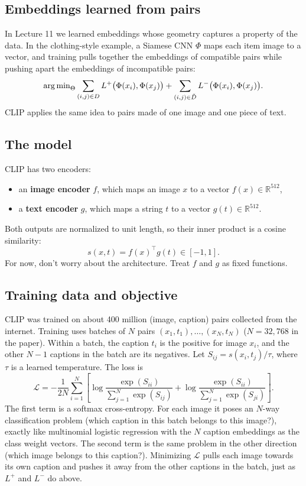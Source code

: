 \subsection{Embeddings learned from pairs}

In Lecture 11 we learned embeddings whose geometry captures a property of the
data. In the clothing-style example, a Siamese CNN $\Phi$ maps each item image to a
vector, and training pulls together the embeddings of compatible pairs while pushing
apart the embeddings of incompatible pairs:
\[
  \operatorname{arg\,min}_\Theta \sum_{(i,j) \in D} L^+\big(\Phi(x_i), \Phi(x_j)\big)
  + \sum_{(i,j) \in \tilde D} L^-\big(\Phi(x_i), \Phi(x_j)\big).
\]
CLIP applies the same idea to pairs made of one image and one piece of text.

\subsection{The model}

CLIP has two encoders:
\begin{itemize}
\item an \textbf{image encoder} $f$, which maps an image $x$ to a vector $f(x) \in \mathbb{R}^{512}$,
\item a \textbf{text encoder} $g$, which maps a string $t$ to a vector $g(t) \in \mathbb{R}^{512}$.
\end{itemize}
Both outputs are normalized to unit length, so their inner product is a cosine
similarity:
\[
  s(x, t) = f(x)^\top g(t) \in [-1, 1].
\]
For now, don't worry about the architecture. Treat $f$ and $g$ as fixed functions.

\subsection{Training data and objective}

CLIP was trained on about 400 million (image, caption) pairs collected from the
internet. Training uses batches of $N$ pairs $(x_1, t_1), \dots, (x_N, t_N)$ ($N = 32{,}768$
in the paper). Within a batch, the caption $t_i$ is the positive for image $x_i$, and
the other $N-1$ captions in the batch are its negatives. Let
$S_{ij} = s(x_i, t_j) / \tau$, where $\tau$ is a learned temperature. The loss is
\[
  \mathcal{L} = -\frac{1}{2N} \sum_{i=1}^{N} \left[
    \log \frac{\exp(S_{ii})}{\sum_{j=1}^{N} \exp(S_{ij})}
    + \log \frac{\exp(S_{ii})}{\sum_{j=1}^{N} \exp(S_{ji})}
  \right].
\]
The first term is a softmax cross-entropy. For each image it poses an $N$-way
classification problem (which caption in this batch belongs to this image?), exactly
like multinomial logistic regression with the $N$ caption embeddings as the class
weight vectors. The second term is the same problem in the other direction (which
image belongs to this caption?). Minimizing $\mathcal{L}$ pulls each image towards
its own caption and pushes it away from the other captions in the batch, just as
$L^+$ and $L^-$ do above.

